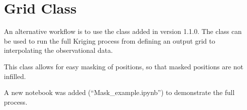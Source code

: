 \documentclass[letterpaper,10pt,english]{sphinxmanual}
\begin{document}
\begin{fulllineitems}
\begin{fulllineitems}
\begin{fulllineitems}
\end{fulllineitems}

\begin{quote}\begin{description}
\sphinxAtStartPar
{}

\end{description}\end{quote}

\end{fulllineitems}


\end{fulllineitems}


\sphinxstepscope


\chapter{Grid Class}
\label{\detokenize{grid:grid-class}}\label{\detokenize{grid::doc}}
\sphinxAtStartPar
An alternative workflow is to use the  class added in version 1.1.0. The  class can be
used to run the full Kriging process from defining an output grid to interpolating the observational
data.

\sphinxAtStartPar
This class allows for easy masking of positions, so that masked positions are not infilled.

\sphinxAtStartPar
A new notebook was added (“Mask\_example.ipynb”) to demonstrate the full process.
\end{document}
